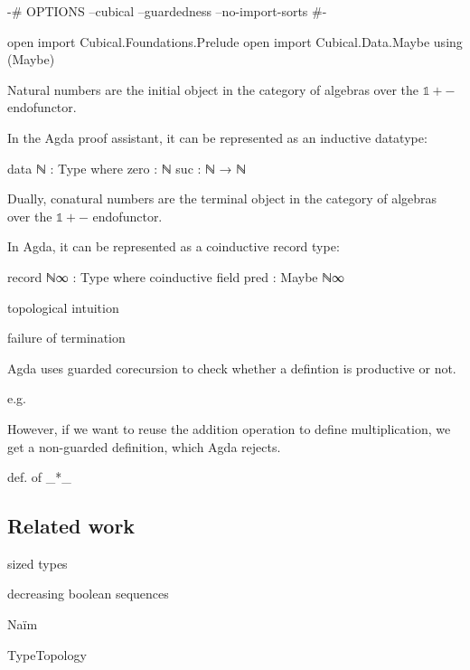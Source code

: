 \begin{code}[hide]
{-# OPTIONS --cubical --guardedness --no-import-sorts #-}

open import Cubical.Foundations.Prelude
open import Cubical.Data.Maybe using (Maybe)
\end{code}

Natural numbers are the initial object in the category of algebras over the
$\mathbb{1} + {-}$ endofunctor.

In the Agda proof assistant, it can be represented as an inductive datatype:

\begin{code}
data ℕ : Type where
  zero  : ℕ
  suc   : ℕ → ℕ
\end{code}

Dually, conatural numbers are the terminal object in the category of algebras
over the $\mathbb{1} + {-}$ endofunctor.

In Agda, it can be represented as a coinductive record type:

\begin{code}
record ℕ∞ : Type where
  coinductive
  field
    pred : Maybe ℕ∞
\end{code}

topological intuition

\begin{figure}[h]
\end{figure}

failure of termination

Agda uses guarded corecursion to check whether a defintion is productive or not.

e.g.

However, if we want to reuse the addition operation to define multiplication, we get a non-guarded definition, which Agda rejects.

def. of \_*\_

\subsection{Related work}

sized types

decreasing boolean sequences

Naïm

TypeTopology
